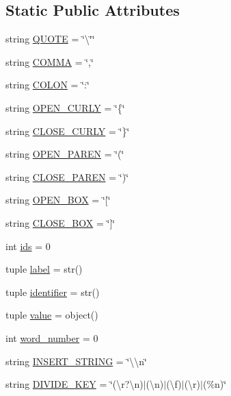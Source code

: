 \subsection*{Static Public Attributes}
\begin{DoxyCompactItemize}
\item 
string \hyperlink{class_element_1_1_element_a2ba6ea972812ca5c327d7679eb3b2604}{Q\+U\+O\+T\+E} = \char`\"{}\textbackslash{}\char`\"{}\char`\"{}
\item 
string \hyperlink{class_element_1_1_element_aff08cd69955438678e52d73da1bf002f}{C\+O\+M\+M\+A} = \char`\"{},\char`\"{}
\item 
string \hyperlink{class_element_1_1_element_a7750912e9ee479944e4d166019e11375}{C\+O\+L\+O\+N} = \char`\"{}\+:\char`\"{}
\item 
string \hyperlink{class_element_1_1_element_a380cb9421e94d5accb082d7bf661d753}{O\+P\+E\+N\+\_\+\+C\+U\+R\+L\+Y} = \char`\"{}\{\char`\"{}
\item 
string \hyperlink{class_element_1_1_element_a4b81edec41793b89da7d1cb29d88c544}{C\+L\+O\+S\+E\+\_\+\+C\+U\+R\+L\+Y} = \char`\"{}\}\char`\"{}
\item 
string \hyperlink{class_element_1_1_element_ab5876fbbbb7dd87b661fad35c50442c3}{O\+P\+E\+N\+\_\+\+P\+A\+R\+E\+N} = \char`\"{}(\char`\"{}
\item 
string \hyperlink{class_element_1_1_element_ab6087402916a835c86e090bdce293d29}{C\+L\+O\+S\+E\+\_\+\+P\+A\+R\+E\+N} = \char`\"{})\char`\"{}
\item 
string \hyperlink{class_element_1_1_element_a2b640848f230e8a8a8be682236ede868}{O\+P\+E\+N\+\_\+\+B\+O\+X} = \char`\"{}\mbox{[}\char`\"{}
\item 
string \hyperlink{class_element_1_1_element_a82bc39d69fdc0392b5d5c27b7f4ba370}{C\+L\+O\+S\+E\+\_\+\+B\+O\+X} = \char`\"{}\mbox{]}\char`\"{}
\item 
int \hyperlink{class_element_1_1_element_a219a21d962bfef58ad39c9762876588f}{ids} = 0
\item 
tuple \hyperlink{class_element_1_1_element_ae566aaad38a02f4c45361f0597b71332}{label} = str()
\item 
tuple \hyperlink{class_element_1_1_element_a86d8c1025236dad25fb5f935a3961482}{identifier} = str()
\item 
tuple \hyperlink{class_element_1_1_element_ace1443ff574a2d07ced07f88d11ba5c8}{value} = object()
\item 
int \hyperlink{class_element_1_1_element_a5e69f0ed0d43817e2546dd8bb3b467e0}{word\+\_\+number} = 0
\item 
string \hyperlink{class_element_1_1_element_a346648cd57ba439d8b4913a645ab81ba}{I\+N\+S\+E\+R\+T\+\_\+\+S\+T\+R\+I\+N\+G} = \char`\"{}\textbackslash{}\textbackslash{}n\char`\"{}
\item 
string \hyperlink{class_element_1_1_element_ae06a0f0ca0e5499c532f2550cf1ffea6}{D\+I\+V\+I\+D\+E\+\_\+\+K\+E\+Y} = \char`\"{}(\textbackslash{}r?\textbackslash{}n)$\vert$(\textbackslash{}n)$\vert$(\textbackslash{}f)$\vert$(\textbackslash{}r)$\vert$(\%n)\char`\"{}
\end{DoxyCompactItemize}


